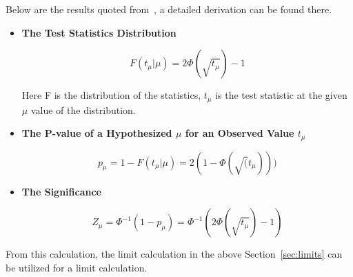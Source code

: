 Below are the results quoted from~\cite{2011}, a detailed derivation can be found there. 

\begin{itemize}
    \item \textbf{The Test Statistics Distribution}

\begin{equation}
    F(t_{\mu}| \mu) = 2\Phi(\sqrt{t_{\mu}})-1
\label{eq:teststatistics}
\end{equation}

Here F is the distribution of the statistics, $t_\mu$ is the test statistic at the given $\mu$ value of the distribution. 

\item \textbf{The P-value of a Hypothesized $\mu$ for an Observed Value $t_\mu$}

\begin{equation}
p_{\mu} = 1-F(t_{\mu}| \mu)=2(1-\Phi(\sqrt(t_{\mu})))
\end{equation}


\item \textbf{The Significance}

\begin{equation}
Z_{\mu} = \Phi^{-1}(1-p_{\mu})  = \Phi^{-1}(2\Phi(\sqrt{t_{\mu}})-1)
\end{equation}

\end{itemize}

From this calculation, the limit calculation in the above Section~\ref{sec:limits} can be utilized for a limit calculation. 

%
%
%



%
%


